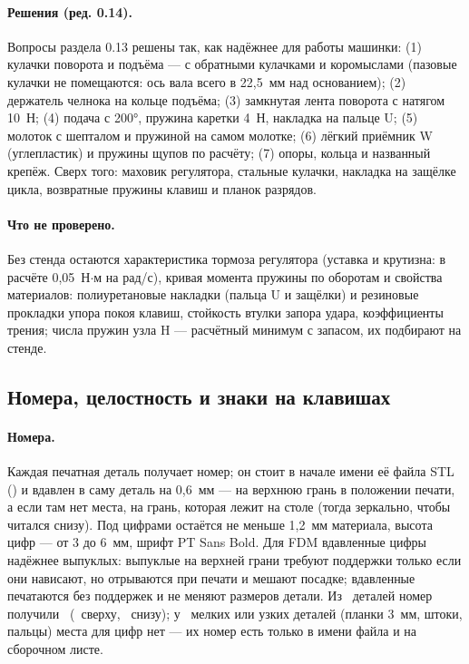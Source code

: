 \paragraph{Решения (ред. 0.14).} Вопросы раздела 0.13 решены так, как надёжнее для работы машинки: (1) кулачки поворота и подъёма — с обратными кулачками и коромыслами (пазовые кулачки не помещаются: ось вала всего в 22,5~мм над основанием); (2) держатель челнока на кольце подъёма; (3) замкнутая лента поворота с натягом 10~Н; (4) подача с 200°, пружина каретки 4~Н, накладка на пальце U; (5) молоток с шепталом и пружиной на самом молотке; (6) лёгкий приёмник W (углепластик) и пружины щупов по расчёту; (7) опоры, кольца и названный крепёж. Сверх того: маховик регулятора, стальные кулачки, накладка на защёлке цикла, возвратные пружины клавиш и планок разрядов.

\paragraph{Что не проверено.} Без стенда остаются характеристика тормоза регулятора (уставка и крутизна: в расчёте 0,05~Н$\cdot$м на рад/с), кривая момента пружины по оборотам и свойства материалов: полиуретановые накладки (пальца U и защёлки) и резиновые прокладки упора покоя клавиш, стойкость втулки запора удара, коэффициенты трения; числа пружин узла H — расчётный минимум с запасом, их подбирают на стенде.

\subsection{Номера, целостность и знаки на клавишах}
\label{sec:numbers}

\paragraph{Номера.} Каждая печатная деталь получает номер; он стоит в начале имени её файла STL () и вдавлен в саму деталь на 0,6~мм — на верхнюю грань в положении печати, а если там нет места, на грань, которая лежит на столе (тогда зеркально, чтобы читался снизу). Под цифрами остаётся не меньше 1,2~мм материала, высота цифр — от 3 до 6~мм, шрифт PT Sans Bold. Для FDM вдавленные цифры надёжнее выпуклых: выпуклые на верхней грани требуют поддержки только если они нависают, но отрываются при печати и мешают посадке; вдавленные печатаются без поддержек и не меняют размеров детали. Из \mnprint\ деталей номер получили \mnnum\ (\mnnumtop\ сверху, \mnnumbot\ снизу); у \mnnonum\ мелких или узких деталей (планки 3~мм, штоки, пальцы) места для цифр нет — их номер есть только в имени файла и на сборочном листе.

